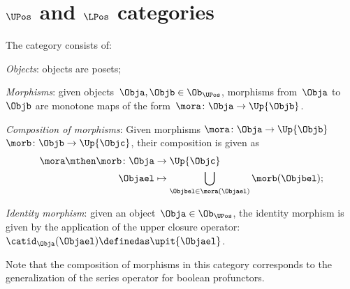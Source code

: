 %
%

\section{$\UPos$ and $\LPos$ categories}

\begin{definition}
\label{def:upos_cat}
The category \UPos consists of:
\begin{compactenum}
    \item \emph{Objects}: objects are posets;
    \item \emph{Morphisms}: given objects~$\Obja,\Objb\in \Ob_\UPos$, morphisms from~$\Obja$ to~$\Objb$ are monotone maps of the form~$\mora \colon \Obja \to \Up{\Objb}$.
    \item \emph{Composition of morphisms}: Given morphisms $\mora\colon \Obja \to \Up{\Objb}$~ $\morb\colon \Objb\to \Up{\Objc}$, their composition is given as
    \begin{equation}
    \begin{aligned}
        \mora \mthen \morb \colon \Obja&\to \Up{\Objc}\\
        \Objael&\mapsto \bigcup_{\Objbel\in \mora(\Objael)}\morb(\Objbel);
    \end{aligned}
    \end{equation}
    \item \emph{Identity morphism}: given an object~$\Obja\in \Ob_\UPos$, the identity morphism is given by the application of the upper closure operator:~$\catid_\Obja(\Objael)\definedas \upit\{\Objael\}$.
\end{compactenum}
\end{definition}
\begin{remark}
Note that the composition of morphisms in this category corresponds to the generalization of the series operator for boolean profunctors.
\end{remark}

